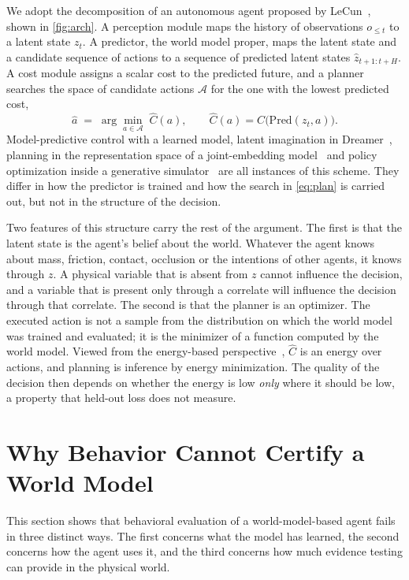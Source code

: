 \documentclass[11pt]{article}
\theoremstyle{definition}\newtheorem{definition}{Definition}
\begin{document}
We adopt the decomposition of an autonomous agent proposed by LeCun~\citep{lecun2022path}, shown in \cref{fig:arch}. A perception module maps the history of observations $o_{\le t}$ to a latent state $z_t$. A predictor, the world model proper, maps the latent state and a candidate sequence of actions to a sequence of predicted latent states $\hat z_{t+1:t+H}$. A cost module assigns a scalar cost to the predicted future, and a planner searches the space of candidate actions $\mathcal A$ for the one with the lowest predicted cost,
\begin{equation}\label{eq:plan}
\hat a \;=\; \arg\min_{a\in\mathcal A}\; \hat C(a), \qquad \hat C(a)=C\big(\mathrm{Pred}(z_t,a)\big).
\end{equation}
Model-predictive control with a learned model, latent imagination in Dreamer~\citep{hafner2023dreamerv3}, planning in the representation space of a joint-embedding model~\citep{assran2025vjepa2} and policy optimization inside a generative simulator~\citep{nvidia2025cosmos} are all instances of this scheme. They differ in how the predictor is trained and how the search in \cref{eq:plan} is carried out, but not in the structure of the decision.

Two features of this structure carry the rest of the argument. The first is that the latent state is the agent's belief about the world. Whatever the agent knows about mass, friction, contact, occlusion or the intentions of other agents, it knows through $z$. A physical variable that is absent from $z$ cannot influence the decision, and a variable that is present only through a correlate will influence the decision through that correlate. The second is that the planner is an optimizer. The executed action is not a sample from the distribution on which the world model was trained and evaluated; it is the minimizer of a function computed by the world model. Viewed from the energy-based perspective~\citep{lecun2006ebm}, $\hat C$ is an energy over actions, and planning is inference by energy minimization. The quality of the decision then depends on whether the energy is low \emph{only} where it should be low, a property that held-out loss does not measure.

\section{Why Behavior Cannot Certify a World Model}\label{sec:behavior}
This section shows that behavioral evaluation of a world-model-based agent fails in three distinct ways. The first concerns what the model has learned, the second concerns how the agent uses it, and the third concerns how much evidence testing can provide in the physical world.
\end{document}
